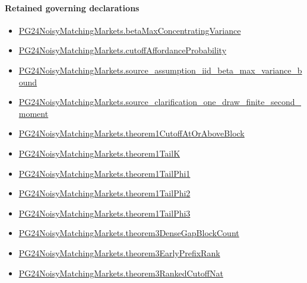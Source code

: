 \documentclass[10pt]{article}
\begin{document}
\paragraph{Retained governing declarations}
\begin{itemize}\raggedright
\item \hyperlink{governing-declaration-322e8322d17fd70c}{PG24\allowbreak{}Noisy\allowbreak{}Matching\allowbreak{}Markets.\allowbreak{}beta\allowbreak{}Max\allowbreak{}Concentrating\allowbreak{}Variance}
\item \hyperlink{governing-declaration-a4a2a08d89f647e4}{PG24\allowbreak{}Noisy\allowbreak{}Matching\allowbreak{}Markets.\allowbreak{}cutoff\allowbreak{}Affordance\allowbreak{}Probability}
\item \hyperlink{governing-declaration-106a735d10bd3342}{PG24\allowbreak{}Noisy\allowbreak{}Matching\allowbreak{}Markets.\allowbreak{}source\_\allowbreak{}assumption\_\allowbreak{}iid\_\allowbreak{}beta\_\allowbreak{}max\_\allowbreak{}variance\_\allowbreak{}bound}
\item \hyperlink{governing-declaration-046b66910b6038e5}{PG24\allowbreak{}Noisy\allowbreak{}Matching\allowbreak{}Markets.\allowbreak{}source\_\allowbreak{}clarification\_\allowbreak{}one\_\allowbreak{}draw\_\allowbreak{}finite\_\allowbreak{}second\_\allowbreak{}moment}
\item \hyperlink{governing-declaration-3c7a8399566177d2}{PG24\allowbreak{}Noisy\allowbreak{}Matching\allowbreak{}Markets.\allowbreak{}theorem1\allowbreak{}Cutoff\allowbreak{}At\allowbreak{}Or\allowbreak{}Above\allowbreak{}Block}
\item \hyperlink{governing-declaration-293a20a9c7b67aee}{PG24\allowbreak{}Noisy\allowbreak{}Matching\allowbreak{}Markets.\allowbreak{}theorem1\allowbreak{}Tail\allowbreak{}K}
\item \hyperlink{governing-declaration-296c254211118e37}{PG24\allowbreak{}Noisy\allowbreak{}Matching\allowbreak{}Markets.\allowbreak{}theorem1\allowbreak{}Tail\allowbreak{}Phi1}
\item \hyperlink{governing-declaration-7a36399b03a33917}{PG24\allowbreak{}Noisy\allowbreak{}Matching\allowbreak{}Markets.\allowbreak{}theorem1\allowbreak{}Tail\allowbreak{}Phi2}
\item \hyperlink{governing-declaration-f214e532deafeb52}{PG24\allowbreak{}Noisy\allowbreak{}Matching\allowbreak{}Markets.\allowbreak{}theorem1\allowbreak{}Tail\allowbreak{}Phi3}
\item \hyperlink{governing-declaration-b7800b4792933f3e}{PG24\allowbreak{}Noisy\allowbreak{}Matching\allowbreak{}Markets.\allowbreak{}theorem3\allowbreak{}Dense\allowbreak{}Gap\allowbreak{}Block\allowbreak{}Count}
\item \hyperlink{governing-declaration-2c7383ab7c4386a1}{PG24\allowbreak{}Noisy\allowbreak{}Matching\allowbreak{}Markets.\allowbreak{}theorem3\allowbreak{}Early\allowbreak{}Prefix\allowbreak{}Rank}
\item \hyperlink{governing-declaration-b5b9b3206590b33e}{PG24\allowbreak{}Noisy\allowbreak{}Matching\allowbreak{}Markets.\allowbreak{}theorem3\allowbreak{}Ranked\allowbreak{}Cutoff\allowbreak{}Nat}
\end{itemize}
\end{document}
